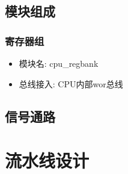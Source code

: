 \documentclass[10pt]{book}
\begin{document}
\section{模块组成}
\subsection{寄存器组}
\begin{itemize}
  \item 模块名: cpu\_regbank
  \item 总线接入: CPU内部wor总线
\end{itemize}

\section{信号通路}

\chapter{流水线设计}
\end{document}
